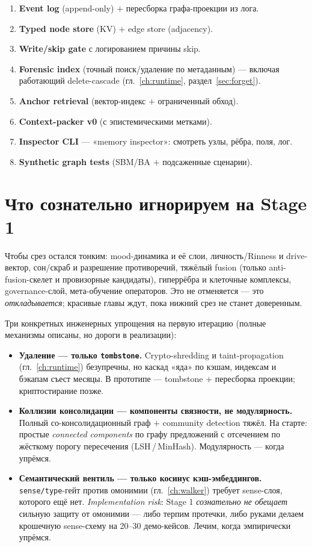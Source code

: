 \begin{enumerate}\itemsep1pt
\item \textbf{Event log} (append-only) $+$ пересборка графа-проекции из лога.
\item \textbf{Typed node store} (KV) $+$ edge store (adjacency).
\item \textbf{Write/skip gate} с логированием причины skip.
\item \textbf{Forensic index} (точный поиск/удаление по метаданным) — включая
работающий delete-cascade (гл.~\ref{ch:runtime}, раздел~\ref{sec:forget}).
\item \textbf{Anchor retrieval} (вектор-индекс $+$ ограниченный обход).
\item \textbf{Context-packer v0} (с эпистемическими метками).
\item \textbf{Inspector CLI} — «memory inspector»: смотреть узлы, рёбра, поля, лог.
\item \textbf{Synthetic graph tests} (SBM/BA $+$ подсаженные сценарии).
\end{enumerate}

\section{Что сознательно игнорируем на Stage 1}

Чтобы срез остался тонким: mood-динамика и её слои, личность/Rinness и drive-вектор,
сон/скраб и разрешение противоречий, тяжёлый fusion (только anti-fusion-скелет и
провизорные кандидаты), гиперрёбра и клеточные комплексы, governance-слой,
мета-обучение операторов. Это не отменяется — это \emph{откладывается}; красивые
главы ждут, пока нижний срез не станет доверенным.

Три конкретных инженерных упрощения на первую итерацию (полные механизмы описаны, но
дороги в реализации):
\begin{itemize}\itemsep2pt
\item \textbf{Удаление — только \texttt{tombstone}.} Crypto-shredding и
taint-propagation (гл.~\ref{ch:runtime}) безупречны, но каскад «яда» по кэшам, индексам
и бэкапам съест месяцы. В прототипе — tombstone $+$ пересборка проекции; криптостирание
позже.
\item \textbf{Коллизии консолидации — компоненты связности, не модулярность.} Полный
со-консолидационный граф $+$ community detection тяжёл. На старте: простые
\emph{connected components} по графу предложений с отсечением по жёсткому порогу
пересечения (LSH\,/\,MinHash). Модулярность — когда упрёмся.
\item \textbf{Семантический вентиль — только косинус кэш-эмбеддингов.}
\texttt{sense/type}-гейт против омонимии (гл.~\ref{ch:walker}) требует sense-слоя,
которого ещё нет. \emph{Implementation risk}: Stage 1 \emph{сознательно не обещает}
сильную защиту от омонимии — либо терпим протечки, либо руками делаем крошечную
sense-схему на 20--30 демо-кейсов. Лечим, когда эмпирически упрёмся.
\end{itemize}

